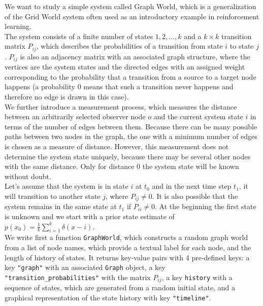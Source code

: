 \documentclass{tstextbook}
\begin{document}
\begin{example}
We want to study a simple system called Graph World, which is a generalization of the Grid World system often used as an introductory example in reinforcement learning.\\

The system consists of a finite number of states $1,2,\ldots,k$ and a $k\times k$ transition matrix $P_{ij}$, which describes the probabilities of a transition from state $i$ to state $j$. $P_{ij}$ is also an adjacency matrix with an associated graph structure, where the vertices are the system states and the directed edges with an assigned weight corresponding to the probability that a transition from a source to a target node happens (a probability $0$ means that such a transition never happens and therefore no edge is drawn in this case).\\

We further introduce a measurement process, which measures the distance between an arbitrarily selected observer node $o$ and the current system state $i$ in terms of the number of edges between them. Because there can be many possible paths between two nodes in the graph, the one with a minimum number of edges is chosen as a measure of distance. However, this measurement does not determine the system state uniquely, because there may be several other nodes with the same distance. Only for distance $0$ the system state will be known without doubt. \\

Let's assume that the system is in state $i$ at $t_0$ and in the next time step $t_1$, it will transition to another state $j$, where $P_{ij}\neq 0$. It is also possible that the system remains in the same state at $t_1$ if $P_{ii}\neq 0$. At the beginning the first state is unknown and we start with a prior state estimate of $p(x_0)=\frac{1}{k}\sum_{i=1}^{k}\delta(x-i)$.\\

We write first a function \texttt{GraphWorld}, which constructs a random graph world from a list of node names, which provide a textual label for each node, and the length of history of states. It returns key-value pairs with 4 pre-defined keys: a key \texttt{"graph"} with an associated \texttt{Graph} object, a key \texttt{"transition\_probabilities"} with the matrix $P_{ij}$, a key \texttt{history} with a sequence of states, which are generated from a random initial state, and a graphical representation of the state history with key \texttt{"timeline"}.


\end{example}
\end{document}
